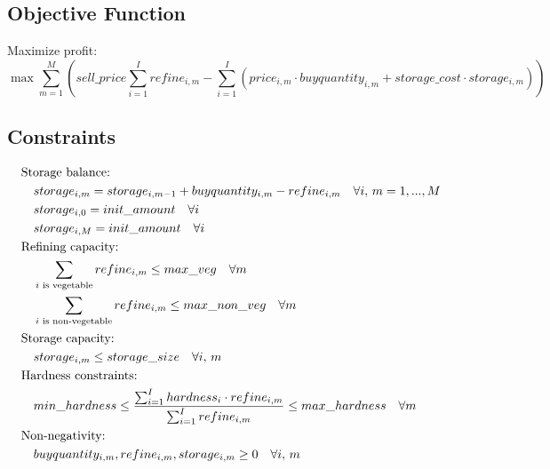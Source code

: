 \documentclass{article}
\begin{document}
\subsection*{Objective Function}
Maximize profit:
\[
\max \sum_{m=1}^{M} \left( sell\_price \sum_{i=1}^{I} refine_{i,m} - \sum_{i=1}^{I} \left( price_{i,m} \cdot buyquantity_{i,m} + storage\_cost \cdot storage_{i,m} \right) \right)
\]

\subsection*{Constraints}
\begin{align}
    &\text{Storage balance:} \notag \\
    &\quad storage_{i,m} = storage_{i,m-1} + buyquantity_{i,m} - refine_{i,m} \quad \forall i, \, m = 1,...,M \\
    &\quad storage_{i,0} = init\_amount \quad \forall i \\
    &\quad storage_{i,M} = init\_amount \quad \forall i \\
    &\text{Refining capacity:} \notag \\
    &\quad \sum_{i \text{ is vegetable}} refine_{i,m} \leq max\_veg \quad \forall m \\
    &\quad \sum_{i \text{ is non-vegetable}} refine_{i,m} \leq max\_non\_veg \quad \forall m \\
    &\text{Storage capacity:} \notag \\
    &\quad storage_{i,m} \leq storage\_size \quad \forall i, \, m \\
    &\text{Hardness constraints:} \notag \\
    &\quad min\_hardness \leq \frac{\sum_{i=1}^{I} hardness_i \cdot refine_{i,m}}{\sum_{i=1}^{I} refine_{i,m}} \leq max\_hardness \quad \forall m \\
    &\text{Non-negativity:} \notag \\
    &\quad buyquantity_{i,m}, refine_{i,m}, storage_{i,m} \geq 0 \quad \forall i, \, m
\end{align}
\end{document}
